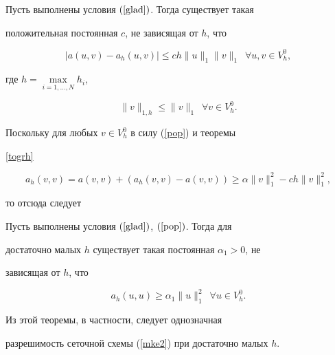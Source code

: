 \begin{thm} \label{togrh}


Пусть выполнены условия $(\ref{glad})$. Тогда существует такая


положительная постоянная $c$, не зависящая от $h$, что


$$


|a(u,v) -a_h(u,v) | \le c h \|u\|_{1}\|v\|_{1} \ \; \forall


u,v \in V_h^0,


$$


где $h=\max\limits_{i=1,\dotsc,N}h_i$,


$$




\|v\|_{1,h} \le \|v\|_{1} \ \; \forall v \in V_h^0.


$$


\end{thm}





Поскольку для любых $v\in V_h^0$ в силу (\ref{pop}) и теоремы


\ref{togrh}


$$


a_h(v,v)=a(v,v)+(a_h(v,v)-a(v,v))\ge \alpha \|v\|^2_{1}-c h \|v\|^2_{1},


$$


то отсюда следует





\begin{thm} \label{topogh}


Пусть выполнены условия $(\ref{glad})$, $(\ref{pop})$. Тогда для


достаточно малых $h$ существует такая постоянная $\alpha_1>0$, не


зависящая от $h$, что


$$


a_h(u,u) \ge \alpha_1 \|u\|^2_{1} \ \; \forall u \in V_h^0.


$$


\end{thm}





Из этой теоремы, в частности, следует однозначная


разрешимость сеточной схемы (\ref{mke2}) при достаточно малых $h$.





